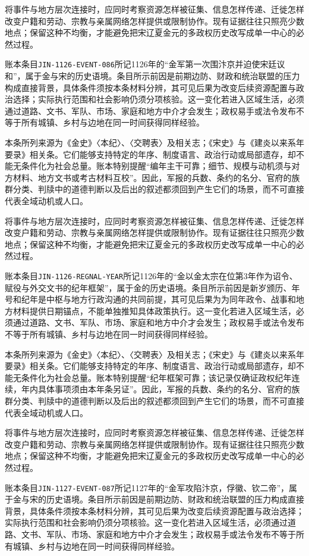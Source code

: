 将事件与地方层次连接时，应同时考察资源怎样被征集、信息怎样传递、迁徙怎样改变户籍和劳动、宗教与亲属网络怎样提供或限制协作。现有证据往往只照亮少数地点；保留这种不均衡，才能避免把宋辽夏金元的多政权历史改写成单一中心的必然过程。

账本条目\texttt{JIN-1126-EVENT-086}所记1126年的“金军第一次围汴京并迫使宋廷议和”，属于金与宋的历史语境。条目所示前因是前期边防、财政和统治联盟的压力构成直接背景，具体条件须按本条材料分辨，其可见后果为改变后续资源配置与政治选择；实际执行范围和社会影响仍须分项核验。这一变化若进入区域生活，必须通过道路、文书、军队、市场、家庭和地方中介才会发生；政权易手或法令发布不等于所有城镇、乡村与边地在同一时间获得同样经验。

本条所列来源为《金史》〈本纪〉、〈交聘表〉及相关志；《宋史》与《建炎以来系年要录》相关条。它们能够支持特定的年序、制度语言、政治行动或局部遗存，却不能无条件化为社会总量。账本特别提醒“编年主干可靠；细节、规模与动机须与对方材料、地方文书或考古材料互校”。因此，军报的兵数、条约的名分、官府的族群分类、判牍中的道德判断以及后出的叙述都须回到产生它们的场景，而不可直接代表全域动机或人口。

将事件与地方层次连接时，应同时考察资源怎样被征集、信息怎样传递、迁徙怎样改变户籍和劳动、宗教与亲属网络怎样提供或限制协作。现有证据往往只照亮少数地点；保留这种不均衡，才能避免把宋辽夏金元的多政权历史改写成单一中心的必然过程。

账本条目\texttt{JIN-1126-REGNAL-YEAR}所记1126年的“金以金太宗在位第3年作为诏令、赋役与外交文书的纪年框架”，属于金的历史语境。条目所示前因是新岁颁历、年号和纪年是中枢与地方行政沟通的共同前提，其可见后果为为同年政令、战事和地方材料提供日期锚点，不能单独推知具体政策执行。这一变化若进入区域生活，必须通过道路、文书、军队、市场、家庭和地方中介才会发生；政权易手或法令发布不等于所有城镇、乡村与边地在同一时间获得同样经验。

本条所列来源为《金史》〈本纪〉、〈交聘表〉及相关志；《宋史》与《建炎以来系年要录》相关条。它们能够支持特定的年序、制度语言、政治行动或局部遗存，却不能无条件化为社会总量。账本特别提醒“纪年框架可靠；该记录仅确证政权纪年连续，年内具体事项须由本年条另证”。因此，军报的兵数、条约的名分、官府的族群分类、判牍中的道德判断以及后出的叙述都须回到产生它们的场景，而不可直接代表全域动机或人口。

将事件与地方层次连接时，应同时考察资源怎样被征集、信息怎样传递、迁徙怎样改变户籍和劳动、宗教与亲属网络怎样提供或限制协作。现有证据往往只照亮少数地点；保留这种不均衡，才能避免把宋辽夏金元的多政权历史改写成单一中心的必然过程。

账本条目\texttt{JIN-1127-EVENT-087}所记1127年的“金军攻陷汴京，俘徽、钦二帝”，属于金与宋的历史语境。条目所示前因是前期边防、财政和统治联盟的压力构成直接背景，具体条件须按本条材料分辨，其可见后果为改变后续资源配置与政治选择；实际执行范围和社会影响仍须分项核验。这一变化若进入区域生活，必须通过道路、文书、军队、市场、家庭和地方中介才会发生；政权易手或法令发布不等于所有城镇、乡村与边地在同一时间获得同样经验。


